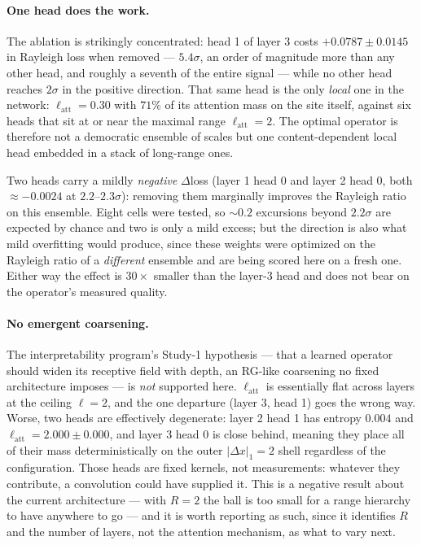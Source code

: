 \documentclass[11pt,a4paper]{article}
\begin{document}
\paragraph{One head does the work.} The ablation is strikingly concentrated:
head 1 of layer 3 costs $+0.0787\pm0.0145$ in Rayleigh loss when removed ---
$5.4\sigma$, an order of magnitude more than any other head, and roughly a
seventh of the entire signal --- while no other head reaches $2\sigma$ in the
positive direction. That same head is the only \emph{local} one in the
network: $\ell_{\mathrm{att}}=0.30$ with $71\%$ of its attention mass on the
site itself, against six heads that sit at or near the maximal range
$\ell_{\mathrm{att}}=2$. The optimal operator is therefore not a democratic
ensemble of scales but one content-dependent local head embedded in a stack of
long-range ones.

Two heads carry a mildly \emph{negative} $\Delta$loss (layer 1 head 0 and
layer 2 head 0, both $\approx-0.0024$ at $2.2$--$2.3\sigma$): removing them
marginally improves the Rayleigh ratio on this ensemble. Eight cells were
tested, so $\sim0.2$ excursions beyond $2.2\sigma$ are expected by chance and
two is only a mild excess; but the direction is also what mild overfitting
would produce, since these weights were optimized on the Rayleigh ratio of a
\emph{different} ensemble and are being scored here on a fresh one. Either way
the effect is $30\times$ smaller than the layer-3 head and does not bear on
the operator's measured quality.

\paragraph{No emergent coarsening.} The interpretability program's
Study-1 hypothesis --- that a learned operator should widen its receptive
field with depth, an RG-like coarsening no fixed architecture imposes --- is
\emph{not} supported here. $\ell_{\mathrm{att}}$ is essentially flat across
layers at the ceiling $\ell=2$, and the one departure (layer 3, head 1) goes
the wrong way. Worse, two heads are effectively degenerate: layer 2 head 1 has
entropy $0.004$ and $\ell_{\mathrm{att}}=2.000\pm0.000$, and layer 3 head 0 is
close behind, meaning they place all of their mass deterministically on the
outer $|\Delta x|_1=2$ shell regardless of the configuration. Those heads are
fixed kernels, not measurements: whatever they contribute, a convolution could
have supplied it. This is a negative result about the current
architecture --- with $R=2$ the ball is too small for a range hierarchy to have
anywhere to go --- and it is worth reporting as such, since it identifies $R$
and the number of layers, not the attention mechanism, as what to vary next.
\end{document}
